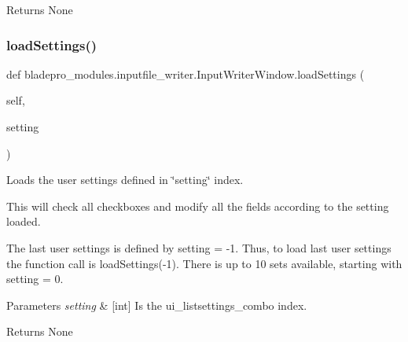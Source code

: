 \begin{DoxyReturn}{Returns}
None 
\end{DoxyReturn}
\hypertarget{a00070_a0c4f30850537553db0ff2e27059733a4}{}\label{a00070_a0c4f30850537553db0ff2e27059733a4} 
\subsubsection{\texorpdfstring{load\+Settings()}{loadSettings()}}
{\footnotesize\ttfamily def bladepro\+\_\+modules.\+inputfile\+\_\+writer.\+Input\+Writer\+Window.\+load\+Settings (\begin{DoxyParamCaption}\item[{}]{self,  }\item[{}]{setting }\end{DoxyParamCaption})}



Loads the user settings defined in \char`\"{}setting\char`\"{} index. 

This will check all checkboxes and modify all the fields according to the setting loaded.

The last user settings is defined by setting = -\/1. Thus, to load last user settings the function call is load\+Settings(-\/1). There is up to 10 sets available, starting with setting = 0.


\begin{DoxyParams}{Parameters}
{\em setting} & \mbox{[}int\mbox{]} Is the ui\+\_\+listsettings\+\_\+combo index. \\
\hline
\end{DoxyParams}
\begin{DoxyReturn}{Returns}
None 
\end{DoxyReturn}
\hypertarget{a00070_ad94f49b4827a3ea0b56070e0149ae2aa}{}\label{a00070_ad94f49b4827a3ea0b56070e0149ae2aa} 
